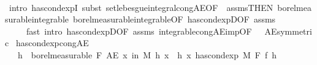 \begin{isabellebody}
\ \ \isamarkupfalse%
\ {\isacharparenleft}{\kern0pt}intro\ has{\isacharunderscore}{\kern0pt}cond{\isacharunderscore}{\kern0pt}expI{\isacharprime}{\kern0pt}{\isacharcomma}{\kern0pt}\ subst\ set{\isacharunderscore}{\kern0pt}lebesgue{\isacharunderscore}{\kern0pt}integral{\isacharunderscore}{\kern0pt}cong{\isacharunderscore}{\kern0pt}AE{\isacharbrackleft}{\kern0pt}OF\ {\isacharunderscore}{\kern0pt}\ assms{\isacharparenleft}{\kern0pt}{}{\isacharparenright}{\kern0pt}{\isacharbrackleft}{\kern0pt}THEN\ borel{\isacharunderscore}{\kern0pt}measurable{\isacharunderscore}{\kern0pt}integrable{\isacharbrackright}{\kern0pt}\ borel{\isacharunderscore}{\kern0pt}measurable{\isacharunderscore}{\kern0pt}integrable{\isacharparenleft}{\kern0pt}{}{\isacharparenright}{\kern0pt}{\isacharbrackleft}{\kern0pt}OF\ has{\isacharunderscore}{\kern0pt}cond{\isacharunderscore}{\kern0pt}expD{\isacharparenleft}{\kern0pt}{}{\isacharparenright}{\kern0pt}{\isacharbrackleft}{\kern0pt}OF\ assms{\isacharparenleft}{\kern0pt}{}{\isacharparenright}{\kern0pt}{\isacharbrackright}{\kern0pt}{\isacharbrackright}{\kern0pt}{\isacharbrackright}{\kern0pt}{\isacharparenright}{\kern0pt}\ \isanewline
\ \ \ \ \ {\isacharparenleft}{\kern0pt}fast\ intro{\isacharcolon}{\kern0pt}\ has{\isacharunderscore}{\kern0pt}cond{\isacharunderscore}{\kern0pt}expD{\isacharbrackleft}{\kern0pt}OF\ assms{\isacharparenleft}{\kern0pt}{}{\isacharparenright}{\kern0pt}{\isacharbrackright}{\kern0pt}\ integrable{\isacharunderscore}{\kern0pt}cong{\isacharunderscore}{\kern0pt}AE{\isacharunderscore}{\kern0pt}imp{\isacharbrackleft}{\kern0pt}OF\ {\isacharunderscore}{\kern0pt}\ {\isacharunderscore}{\kern0pt}\ AE{\isacharunderscore}{\kern0pt}symmetric{\isacharbrackright}{\kern0pt}{\isacharparenright}{\kern0pt}{\isacharplus}{\kern0pt}%
\endisatagproof
{\isafoldproof}%
%
\isadelimproof
\isanewline
%
\endisadelimproof
\isanewline
{}\isamarkupfalse%
\ has{\isacharunderscore}{\kern0pt}cond{\isacharunderscore}{\kern0pt}exp{\isacharunderscore}{\kern0pt}cong{\isacharunderscore}{\kern0pt}AE{\isacharprime}{\kern0pt}{\isacharcolon}{\kern0pt}\isanewline
\ \ \ {\isachardoublequoteopen}h\ {\isasymin}\ borel{\isacharunderscore}{\kern0pt}measurable\ F{\isachardoublequoteclose}\ {\isachardoublequoteopen}AE\ x\ in\ M{\isachardot}{\kern0pt}\ h\ x\ {\isacharequal}{\kern0pt}\ h{\isacharprime}{\kern0pt}\ x{\isachardoublequoteclose}\ {\isachardoublequoteopen}has{\isacharunderscore}{\kern0pt}cond{\isacharunderscore}{\kern0pt}exp\ M\ F\ f\ h{\isacharprime}{\kern0pt}{\isachardoublequoteclose}\isanewline

\end{isabellebody}
